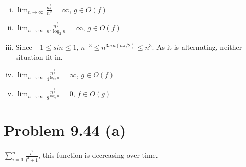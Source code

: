 \documentclass{article}
\def\math#1{$#1$}
\begin{document}
\begin{enumerate}[(a)]
         \begin{enumerate}[i)]
            \item \math{\lim_{n \to \infty} \frac{n^{\frac{5}{2}}}{n^2} = \infty}, \math{g \in O(f)}
            \item \math{\lim_{n \to \infty} \frac{n^{\frac{5}{2}}}{n^2 \log_2 n} = \infty}, \math{g \in O(f)}
            \item Since \math{-1 \leq sin \leq 1}, \math{n^{-3} \leq n^{3sin(n\pi/2)} \leq n^3}. As it is alternating, neither situation fit in.
            \item \math{\lim_{n \to \infty} \frac{n^{\frac{5}{2}}}{4^{\log_2 n}} = \infty}, \math{g \in O(f)}
            \item \math{\lim_{n \to \infty} \frac{n^{\frac{5}{2}}}{8^{\log_2 n}} = 0}, \math{f \in O(g)}
         \end{enumerate}
\end{enumerate}

\section{Problem 9.44 (a)}

\math{\sum_{i=1}^n \frac{i^2}{i^3+1}}, this function is decreasing over time.
\end{document}
